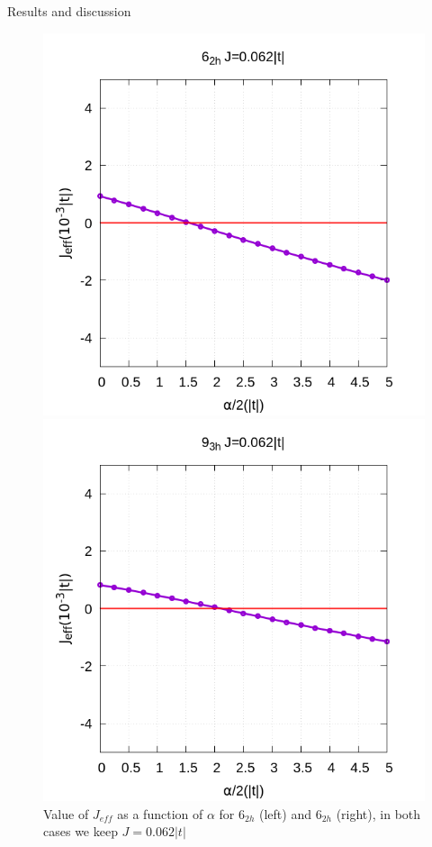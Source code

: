 \documentclass[12pt,twoside]{report}
\begin{document}
\begin{chapter}{Results and discussion}
	\begin{figure}[h!]
		\centering
		\hspace{-2cm}
		\begin{minipage}{0.4\textwidth}
			\includegraphics[scale=0.3]{Jeff_vs_xrep_ar2.png}
		\end{minipage}
		\hspace{2cm}
		\begin{minipage}{0.4\textwidth}
			\includegraphics[scale=0.3]{Jeff_vs_xrep_ar3.png}
		\end{minipage}
		\caption{\label{fig_arxrep} Value of $J_{eff}$ as a function of $\alpha$ for 6$_{2h}$ (left) and 6$_{2h}$ (right), in both cases we keep $J=0.062 |t|$ }
	\end{figure}


\end{chapter}
\end{document}
